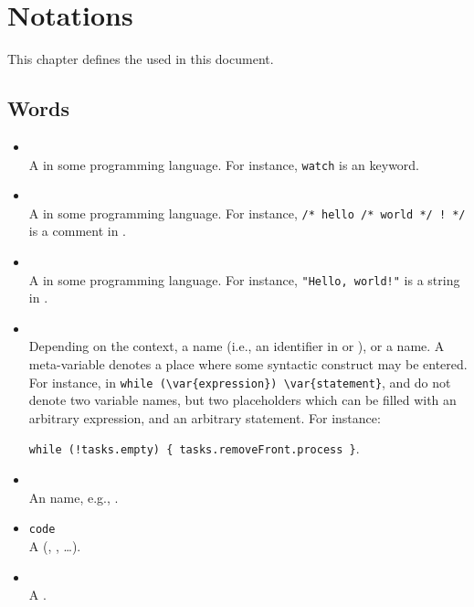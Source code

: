 
\chapter{Notations}
\label{sec:notations}

This chapter defines the  used in this document.

\section{Words}

\begin{itemize}
\item {}\\
  A  in some programming language.  For instance, \lstinline|watch|
  is an \us keyword.

\item {}\\
  A  in some programming language.  For instance,
  \lstinline|/* hello /* world */ ! */| is a comment in \us.

\item {}\\
  A  in some programming language.  For instance,
  \lstinline|"Hello, world!"| is a string in \us.

\item {}\\
  Depending on the context, a  name (i.e., an identifier
  in \Cxx or \us), or a  name.  A meta-variable
  denotes a place where some syntactic construct may be entered.  For
  instance, in \lstinline|while (\var{expression}) \var{statement}|,
   and  do not denote two variable
  names, but two placeholders which can be filled with an arbitrary
  expression, and an arbitrary statement.  For instance:

  \lstinline|while (!tasks.empty) { tasks.removeFront.process }|.

\item {}\\
  An  name, e.g., .
\item \lstinline|code|\\
  A  (\us, \Java, \Cxx\ldots).
\item {}\\
  A .
\end{itemize}

